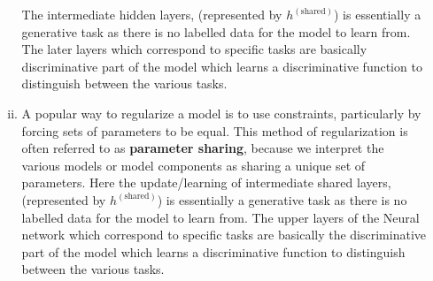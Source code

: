 \documentclass[fleqn]{article}
\begin{document}
\begin{enumerate}[a)]
\begin{enumerate}[i)]
		The intermediate hidden layers, (represented by $h^{(\text{shared})}$) is essentially a generative task as there is no labelled data for the model to learn from. The later layers which correspond to specific tasks are basically discriminative part of the model which learns a discriminative function to distinguish between the various tasks.
		\item 
		A popular way to regularize a model is to use constraints, particularly by forcing sets of parameters to be equal. This method of regularization is often referred to as \textbf{parameter sharing}, because we interpret the various models or model components as sharing a unique set of parameters. 
		Here the update/learning of intermediate shared layers, (represented by $h^{(\text{shared})}$) is essentially a generative task as there is no labelled data for the model to learn from. The upper layers of the Neural network which correspond to specific tasks are basically the discriminative part of the model which learns a discriminative function to distinguish between the various tasks.
	\end{enumerate}
\end{enumerate}
\end{document}
